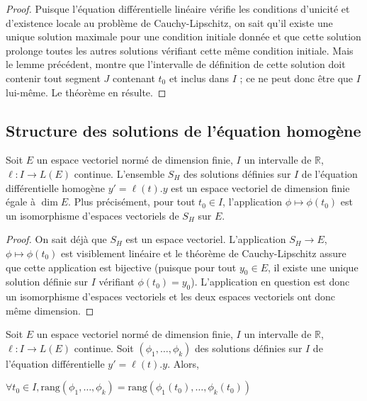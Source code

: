 \begin{proof}
Puisque l'équation différentielle linéaire vérifie les
conditions d'unicité et d'existence locale au problème de
Cauchy-Lipschitz, on sait qu'il existe une unique solution maximale pour
une condition initiale donnée et que cette solution prolonge toutes les
autres solutions vérifiant cette même condition initiale. Mais le lemme
précédent, montre que l'intervalle de définition de cette solution doit
contenir tout segment $J$ contenant $t_0$ et inclus dans $I$ ; ce ne
peut donc être que $I$ lui-même. Le théorème en résulte.
\end{proof}

\subsection{Structure des solutions de l'équation homogène}

\begin{thm}
Soit $E$ un espace vectoriel normé de dimension finie, $I$
un intervalle de $\mathbb{R}$, $\ell : I \rightarrow L(E)$ continue. L'ensemble $S_H$ des
solutions définies sur $I$ de l'équation différentielle homogène $y' =
\ell(t).y$ est un espace vectoriel de dimension finie égale à
$\dim E$. Plus précisément, pour tout
$t_0 \in I$, l'application
$\phi \mapsto \phi(t_0)$ est un isomorphisme
d'espaces vectoriels de $S_H$ sur $E$.
\end{thm}

\begin{proof}
On sait déjà que $S_H$ est un espace vectoriel.
L'application $S_H \rightarrow E$,
$\phi \mapsto \phi(t_0)$ est visiblement linéaire et
le théorème de Cauchy-Lipschitz assure que cette application est
bijective (puisque pour tout $y_0 \in E$, il existe une unique
solution définie sur $I$ vérifiant $\phi(t_0) = y_0$).
L'application en question est donc un isomorphisme d'espaces vectoriels
et les deux espaces vectoriels ont donc même dimension.
\end{proof}

\begin{cor}
Soit $E$ un espace vectoriel normé de dimension finie, $I$
un intervalle de $\mathbb{R}$, $\ell : I \rightarrow L(E)$ continue. Soit
$(\phi_1,\ldots,\phi_k)$
des solutions définies sur $I$ de l'équation différentielle $y' = \ell(t).y$.
Alors,

$\forall t_0 \in I,
\text{rang}(\phi_1,\ldots,\phi_k) = \text{rang}(\phi_1(t_0),\ldots,\phi_k(t_0))$
\end{cor}

